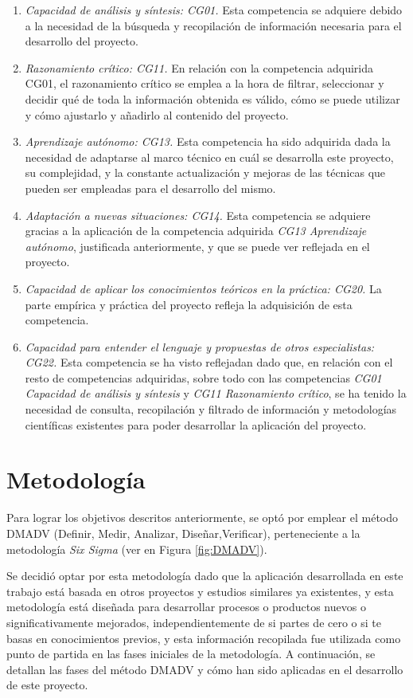 \begin{enumerate}
  \item \textit{Capacidad de análisis y síntesis: CG01.} Esta competencia se adquiere debido a la necesidad de la búsqueda y recopilación de información necesaria para el desarrollo del proyecto.
  \item \textit{Razonamiento crítico: CG11.} En relación con la competencia adquirida CG01, el razonamiento crítico se emplea a la hora de filtrar, seleccionar y decidir qué de toda la información obtenida es válido, cómo se puede utilizar y cómo ajustarlo y añadirlo al contenido del proyecto.
  \item \textit{Aprendizaje autónomo: CG13.} Esta competencia ha sido adquirida dada  la necesidad de adaptarse al marco técnico en cuál se desarrolla este proyecto, su complejidad, y la constante actualización y mejoras de las técnicas que pueden ser empleadas para el desarrollo del mismo.
  \item \textit{Adaptación a nuevas situaciones: CG14.} Esta competencia se adquiere gracias a la aplicación de la competencia adquirida \textit{CG13 Aprendizaje autónomo}, justificada anteriormente, y que se puede ver reflejada en el proyecto.
  \item \textit{Capacidad de aplicar los conocimientos teóricos en la práctica: CG20.} La parte empírica y práctica del proyecto refleja la adquisición de esta competencia.
  \item \textit{Capacidad para entender el lenguaje y propuestas de otros especialistas: CG22.} Esta competencia se ha visto reflejadan dado que, en relación con el resto de competencias adquiridas, sobre todo con las competencias \textit{CG01 Capacidad de análisis y síntesis} y \textit{CG11 Razonamiento crítico}, se ha tenido la necesidad de consulta, recopilación y filtrado de información y metodologías científicas existentes para poder desarrollar la aplicación del proyecto.
\end{enumerate} 


\section{Metodología}
\label{sec:metodologia}

Para lograr los objetivos descritos anteriormente, se optó por emplear el método DMADV (Definir, Medir, Analizar, Diseñar,Verificar), perteneciente a la metodología \textit{Six Sigma} (ver en Figura \ref{fig:DMADV}). 

Se decidió optar por esta metodología dado que la aplicación desarrollada en este trabajo está basada en otros proyectos y estudios similares ya existentes, y esta metodología está diseñada para desarrollar procesos o productos nuevos o significativamente mejorados, independientemente de si partes de cero o si te basas en conocimientos previos, y esta información recopilada fue utilizada como punto de partida en las fases iniciales de la metodología. A continuación, se detallan las fases del método DMADV y cómo han sido aplicadas en el desarrollo de este proyecto.

